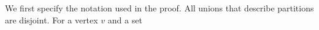 We first specify the notation used in the proof. All unions that
describe partitions are disjoint. For a vertex $v$ and a set